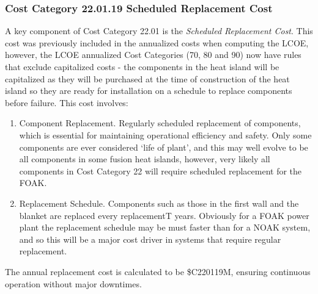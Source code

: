 
\subsubsection*{Cost Category 22.01.19 Scheduled Replacement Cost}

A key component of Cost Category 22.01 is the \textit{Scheduled Replacement Cost}.  This cost was previously included in the annualized costs when computing the LCOE, however, the LCOE annualized Cost Categories (70, 80 and 90) now have rules that exclude capitalized costs - the components in the heat island will be capitalized as they will be purchased at the time of construction of the heat island so they are ready for installation on a schedule to replace components before failure.  This cost involves:

\begin{enumerate}
    \item Component Replacement. Regularly scheduled replacement of components, which is essential for maintaining operational efficiency and safety.  Only some components are ever considered `life of plant', and this may well evolve to be all components in some fusion heat islands, however, very likely all components in Cost Category 22 will require scheduled replacement for the FOAK.
    \item Replacement Schedule. Components such as those in the first wall and the blanket are replaced every replacementT years.  Obviously for a FOAK power plant the replacement schedule may be must faster than for a NOAK system, and so this will be a major cost driver in systems that require regular replacement.
\end{enumerate}

The annual replacement cost is calculated to be \$C220119M, ensuring continuous operation without major downtimes.